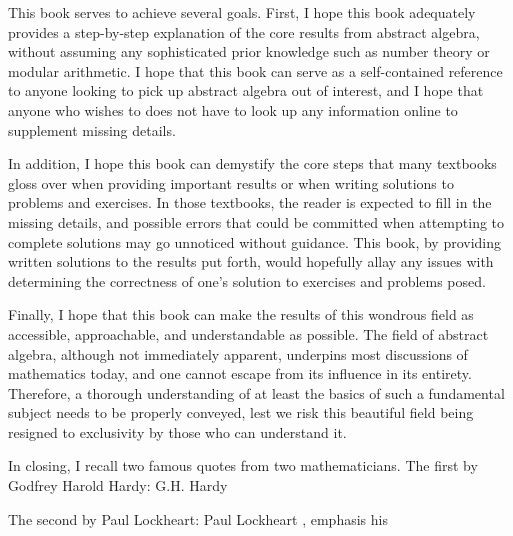 This book serves to achieve several goals. First, I hope this book adequately provides a step-by-step explanation of the core results from abstract algebra, without assuming any sophisticated prior knowledge such as number theory or modular arithmetic. I hope that this book can serve as a self-contained reference to anyone looking to pick up abstract algebra out of interest, and I hope that anyone who wishes to does not have to look up any information online to supplement missing details.

In addition, I hope this book can demystify the core steps that many textbooks gloss over when providing important results or when writing solutions to problems and exercises. In those textbooks, the reader is expected to fill in the missing details, and possible errors that could be committed when attempting to complete solutions may go unnoticed without guidance. This book, by providing written solutions to the results put forth, would hopefully allay any issues with determining the correctness of one's solution to exercises and problems posed.

Finally, I hope that this book can make the results of this wondrous field as accessible, approachable, and understandable as possible. The field of abstract algebra, although not immediately apparent, underpins most discussions of mathematics today, and one cannot escape from its influence in its entirety. Therefore, a thorough understanding of at least the basics of such a fundamental subject needs to be properly conveyed, lest we risk this beautiful field being resigned to exclusivity by those who can understand it.

\newpage

In closing, I recall two famous quotes from two mathematicians. The first by Godfrey Harold Hardy:
    {G.H. Hardy}
    {\cite[p.~43]{hardy_snow_1969}}

The second by Paul Lockheart:
    {Paul Lockheart}
    {\cite[p.~8]{lockheart_2002}, emphasis his}

